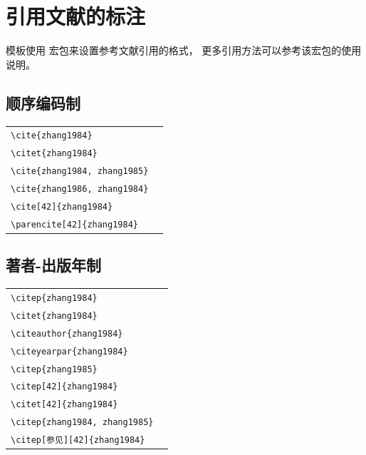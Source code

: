 
\chapter{引用文献的标注}

模板使用  宏包来设置参考文献引用的格式，
更多引用方法可以参考该宏包的使用说明。


\section{顺序编码制}

\noindent
\begin{tabular}{l@{\quad$\Rightarrow$\quad}l}
  \verb|\cite{zhang1984}|            & \cite{zhang1984}            \\
  \verb|\citet{zhang1984}|           & \citet{zhang1984}           \\
  \verb|\cite{zhang1984, zhang1985}| & \cite{zhang1984, zhang1985} \\
  \verb|\cite{zhang1986, zhang1984}| & \cite{zhang1986, zhang1984} \\
  \verb|\cite[42]{zhang1984}|        & \cite[42]{zhang1984}        \\
  \verb|\parencite[42]{zhang1984}|   & \parencite[42]{zhang1984}   \\
\end{tabular}


\section{著者-出版年制}

\noindent
\begin{tabular}{l@{\quad$\Rightarrow$\quad}l}
  \verb|\citep{zhang1984}|            & \citep{zhang1984}            \\
  \verb|\citet{zhang1984}|            & \citet{zhang1984}            \\
  \verb|\citeauthor{zhang1984}|       & \citeauthor{zhang1984}       \\
  \verb|\citeyearpar{zhang1984}|      & \citeyearpar{zhang1984}      \\
  \verb|\citep{zhang1985}|            & \citep{zhang1985}            \\
  \verb|\citep[42]{zhang1984}|        & \citep[42]{zhang1984}        \\
  \verb|\citet[42]{zhang1984}|        & \citet[42]{zhang1984}        \\
  \verb|\citep{zhang1984, zhang1985}| & \citep{zhang1984, zhang1985} \\
  \verb|\citep[参见][42]{zhang1984}|  & \citep[参见][42]{zhang1984}  \\
\end{tabular}


\nocite{*}
